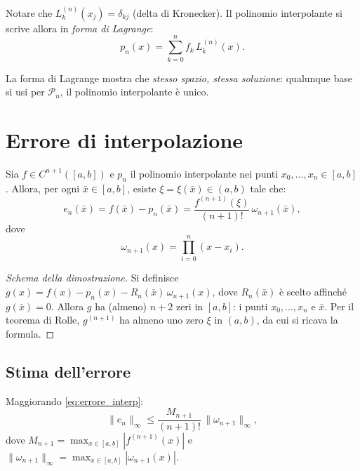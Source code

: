 Notare che $L_k^{(n)}(x_j) = \delta_{kj}$ (delta di Kronecker). Il polinomio
interpolante si scrive allora in \emph{forma di Lagrange}:
\begin{equation}
  p_n(x) = \sum_{k=0}^n f_k\, L_k^{(n)}(x).
  \label{eq:lagrange_polin}
\end{equation}

\begin{remark}
La forma di Lagrange mostra che \emph{stesso spazio, stessa soluzione}: qualunque
base si usi per $\mathcal{P}_n$, il polinomio interpolante è unico.
\end{remark}

\section{Errore di interpolazione}
\label{sec:errore_interp}

\begin{theorem}
\label{thm:errore_interp}
Sia $f \in C^{n+1}([a,b])$ e $p_n$ il polinomio interpolante nei punti
$x_0,\ldots,x_n \in [a,b]$. Allora, per ogni $\bar{x} \in [a,b]$, esiste
$\xi = \xi(\bar{x}) \in (a,b)$ tale che:
\begin{equation}
  e_n(\bar{x}) = f(\bar{x}) - p_n(\bar{x})
  = \frac{f^{(n+1)}(\xi)}{(n+1)!}\,\omega_{n+1}(\bar{x}),
  \label{eq:errore_interp}
\end{equation}
dove
\begin{equation}
  \omega_{n+1}(x) = \prod_{i=0}^n (x - x_i).
  \label{eq:omega}
\end{equation}
\end{theorem}

\begin{proof}[Schema della dimostrazione]
Si definisce $g(x) = f(x) - p_n(x) - R_n(\bar{x})\,\omega_{n+1}(x)$, dove
$R_n(\bar{x})$ è scelto affinché $g(\bar{x}) = 0$. Allora $g$ ha (almeno) $n+2$
zeri in $[a,b]$: i punti $x_0,\ldots,x_n$ e $\bar{x}$. Per il teorema di Rolle,
$g^{(n+1)}$ ha almeno uno zero $\xi$ in $(a,b)$, da cui si ricava la formula.
\end{proof}

\subsection{Stima dell'errore}

Maggiorando \cref{eq:errore_interp}:
\begin{equation}
  \|e_n\|_\infty \leq \frac{M_{n+1}}{(n+1)!}\,\|\omega_{n+1}\|_\infty,
  \label{eq:bound_errore_interp}
\end{equation}
dove $M_{n+1} = \max_{x \in [a,b]} |f^{(n+1)}(x)|$ e
$\|\omega_{n+1}\|_\infty = \max_{x \in [a,b]} |\omega_{n+1}(x)|$.

